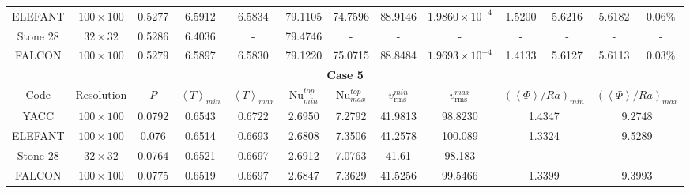 \begin{table}[H]
{\begin{tabular}{|cc|ccccccccccc|}
       ELEFANT & $100\times100$ & 0.5277 & 6.5912 & 6.5834 & 79.1105 & 74.7596 & 88.9146 & $1.9860\times10^{-4}$ & 1.5200 & 5.6216 & 5.6182 & 0.06\% \\
       \rowcolor{gray!25!}
       Stone 28 & $32\times32$ & 0.5286 & 6.4036 & - & 79.4746 & - & - & - & - & - & - & - \\
       FALCON & $100\times100$ & 0.5279 & 6.5897 & 6.5830 & 79.1220 & 75.0715 & 88.8484 & $1.9693\times10^{-4}$ & 1.4133 & 5.6127 & 5.6113 & 0.03\% \\
       \midrule
       \multicolumn{13}{|c|}{\textbf{Case 5}} \\
       \midrule
       Code & Resolution & $P$ & $\left\langle T \right\rangle_{min}$ & $\left\langle T \right\rangle_{max}$ & Nu$^{top}_{min}$ & Nu$^{top}_{max}$ &
       $v_{\textrm{rms}}^{min}$ & $v_{\textrm{rms}}^{max}$ & \multicolumn{2}{c}{$(\left\langle \Phi \right\rangle/Ra)_{min}$} & 
       \multicolumn{2}{c|}{$(\left\langle \Phi \right\rangle/Ra)_{max}$} \\
       \hline
       \rowcolor{gray!25!}
         YACC & $100\times100$ & 0.0792 & 0.6543 & 0.6722 & 2.6950 & 7.2792 & 41.9813 & 98.8230 & \multicolumn{2}{c}{1.4347} & 
         \multicolumn{2}{c|}{9.2748} \\
         ELEFANT & $100\times100$ & 0.076 & 0.6514 & 0.6693 & 2.6808 & 7.3506 & 41.2578 & 100.089 & \multicolumn{2}{c}{1.3324} & 
         \multicolumn{2}{c|}{9.5289} \\
         \rowcolor{gray!25!}
         Stone 28 & $32\times32$ & 0.0764 & 0.6521 & 0.6697 & 2.6912 & 7.0763 & 41.61 & 98.183 & \multicolumn{2}{c}{-} & 
         \multicolumn{2}{c|}{-} \\
         FALCON & $100\times100$ & 0.0775 & 0.6519 & 0.6697 & 2.6847 & 7.3629 & 41.5256 & 99.5466 & \multicolumn{2}{c}{1.3399} & 
         \multicolumn{2}{c|}{9.3993} \\
  \bottomrule
  \end{tabular}}
  \label{tab:visco_mantle}
  \end{table}